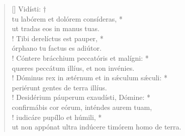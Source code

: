 \begin{verse}[\versewidth]
\vin Vidísti: †\\
\vin tu labórem et dolórem consíderas, *\\
\vin ut tradas eos in manus tuas.\\!
Tibi derelíctus est pauper, *\\
órphano tu factus es adiútor.\\!
\vin Cóntere brácchium peccatóris et malígni: *\\
\vin quæres peccátum illíus, et non invénies.\\!
Dóminus rex in ætérnum et in s\'{æ}culum s\'{æ}culi: *\\
periérunt gentes de terra illíus.\\!
\vin Desidérium páuperum exaudísti, Dómine: *\\
\vin confirmábis cor eórum, inténdes aurem tuam,\\!
iudicáre pupíllo et húmili, *\\
ut non appónat ultra indúcere timórem homo de terra.\\
\end{verse}
\vspace{1cm}



